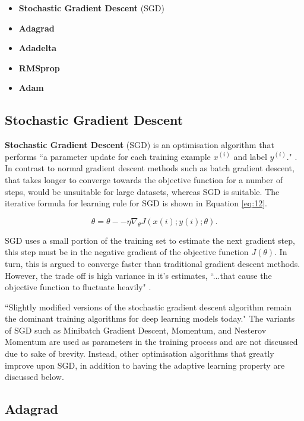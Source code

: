\documentclass[report, 11pt, oneside]{dissertation}
\begin{document}
\begin{itemize}
  \item \textbf{Stochastic Gradient Descent} (SGD)
  \item \textbf{Adagrad}
  \item \textbf{Adadelta}
  \item \textbf{RMSprop}
  \item \textbf{Adam}
\end{itemize}

\subsection{Stochastic Gradient Descent}
\textbf{Stochastic Gradient Descent} (SGD) is an optimisation algorithm that performs ``a parameter update for each training example $x^{(i)}$ and label $y^{(i)}$." \citep[2]{Ruder:2016tr}. In contrast to normal gradient descent methods such as batch gradient descent, that takes longer to converge towards the objective function for a number of steps, would be unsuitable for large datasets, whereas SGD is suitable. The iterative formula for learning rule for SGD is shown in Equation \ref{eq:12}.

\begin{equation} \label{eq:12}
	\theta = \theta -− \eta \nabla_\theta J(x(i); y(i); \theta).
\end{equation}

SGD uses a small portion of the training set to estimate the next gradient step, this step must be in the negative gradient of the objective function $ J(\theta) $. In turn, this is argued to converge faster than traditional gradient descent methods. However, the trade off is high variance in it's estimates, ``...that cause the objective function to fluctuate heavily" \citep[2]{Ruder:2016tr}.

``Slightly modified versions of the stochastic gradient descent algorithm remain the dominant training algorithms for deep learning models today." \citep[15]{Goodfellow-et-al-2016} The variants of SGD such as Minibatch Gradient Descent, Momentum, and Nesterov Momentum are used as parameters in the training process and are not discussed due to sake of brevity. Instead, other optimisation algorithms that greatly improve upon SGD, in addition to having the adaptive learning property are discussed below. 

\subsection{Adagrad}
\end{document}
